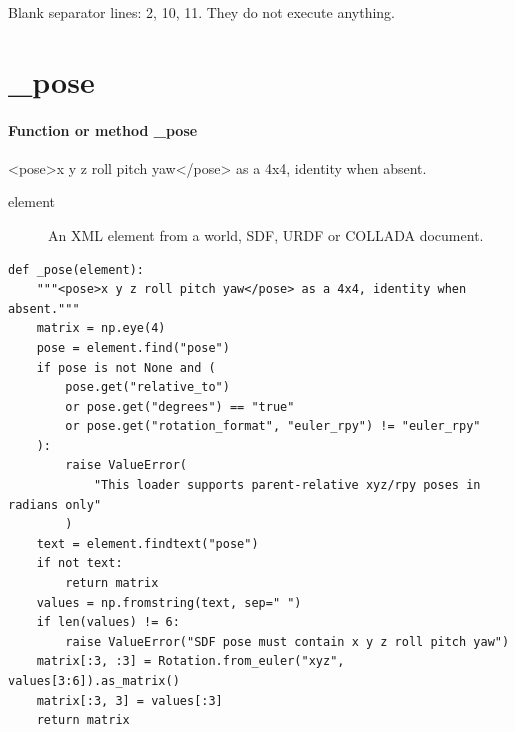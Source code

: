\documentclass[11pt,a4paper]{book}
\begin{document}
Blank separator lines: 2, 10, 11. They do not execute anything.

\section{\_pose}

\paragraph{Function or method \_pose}
<pose>x y z roll pitch yaw</pose> as a 4x4, identity when absent.

\begin{description}
\item[element] An XML element from a world, SDF, URDF or COLLADA document.
\end{description}

\begin{lstlisting}[firstnumber=12]
def _pose(element):
    """<pose>x y z roll pitch yaw</pose> as a 4x4, identity when absent."""
    matrix = np.eye(4)
    pose = element.find("pose")
    if pose is not None and (
        pose.get("relative_to")
        or pose.get("degrees") == "true"
        or pose.get("rotation_format", "euler_rpy") != "euler_rpy"
    ):
        raise ValueError(
            "This loader supports parent-relative xyz/rpy poses in radians only"
        )
    text = element.findtext("pose")
    if not text:
        return matrix
    values = np.fromstring(text, sep=" ")
    if len(values) != 6:
        raise ValueError("SDF pose must contain x y z roll pitch yaw")
    matrix[:3, :3] = Rotation.from_euler("xyz", values[3:6]).as_matrix()
    matrix[:3, 3] = values[:3]
    return matrix


\end{lstlisting}
\end{document}
